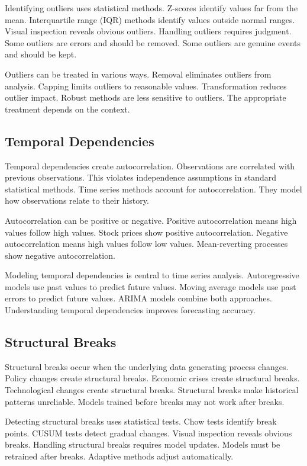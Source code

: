 Identifying outliers uses statistical methods. Z-scores identify values far from the mean. Interquartile range (IQR) methods identify values outside normal ranges. Visual inspection reveals obvious outliers. Handling outliers requires judgment. Some outliers are errors and should be removed. Some outliers are genuine events and should be kept.

Outliers can be treated in various ways. Removal eliminates outliers from analysis. Capping limits outliers to reasonable values. Transformation reduces outlier impact. Robust methods are less sensitive to outliers. The appropriate treatment depends on the context.

\subsection{Temporal Dependencies}

Temporal dependencies create autocorrelation. Observations are correlated with previous observations. This violates independence assumptions in standard statistical methods. Time series methods account for autocorrelation. They model how observations relate to their history.

Autocorrelation can be positive or negative. Positive autocorrelation means high values follow high values. Stock prices show positive autocorrelation. Negative autocorrelation means high values follow low values. Mean-reverting processes show negative autocorrelation.

Modeling temporal dependencies is central to time series analysis. Autoregressive models use past values to predict future values. Moving average models use past errors to predict future values. ARIMA models combine both approaches. Understanding temporal dependencies improves forecasting accuracy.

\subsection{Structural Breaks}

Structural breaks occur when the underlying data generating process changes. Policy changes create structural breaks. Economic crises create structural breaks. Technological changes create structural breaks. Structural breaks make historical patterns unreliable. Models trained before breaks may not work after breaks.

Detecting structural breaks uses statistical tests. Chow tests identify break points. CUSUM tests detect gradual changes. Visual inspection reveals obvious breaks. Handling structural breaks requires model updates. Models must be retrained after breaks. Adaptive methods adjust automatically.

